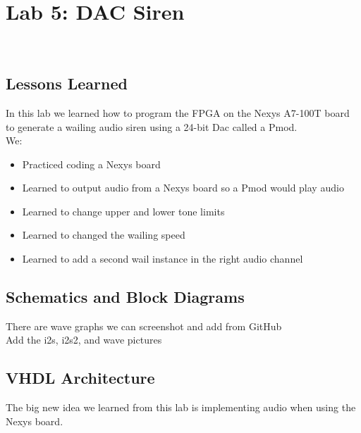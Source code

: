 \chapter{Lab 5: DAC Siren} \\
\label{Introduction}


\section{Lessons Learned
\label{Section::Lessons Learned}}
In this lab we learned how to program the FPGA on the Nexys A7-100T board to generate a wailing audio siren using a 24-bit Dac called a Pmod.  \\
We:
\begin{itemize}
    \item Practiced coding a Nexys board
    \item Learned to output audio from a Nexys board so a Pmod would play audio
    \item Learned to change upper and lower tone limits
    \item Learned to changed the wailing speed
    \item Learned to add a second wail instance in the right audio channel
 \end{itemize}

 \section{Schematics and Block Diagrams}
 There are wave graphs we can screenshot and add from GitHub\\
 Add the i2s, i2s2, and wave pictures\\
 
 \section{VHDL Architecture}
 The big new idea we learned from this lab is implementing audio when using the Nexys board.
 
